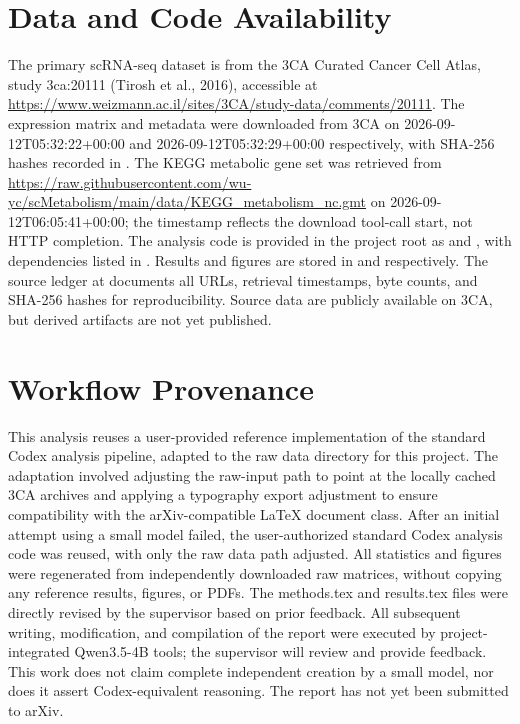 \section{Data and Code Availability}
The primary scRNA-seq dataset is from the 3CA Curated Cancer Cell Atlas, study 3ca:20111 (Tirosh et al., 2016), accessible at \url{https://www.weizmann.ac.il/sites/3CA/study-data/comments/20111}. The expression matrix and metadata were downloaded from 3CA on 2026-09-12T05:32:22+00:00 and 2026-09-12T05:32:29+00:00 respectively, with SHA-256 hashes recorded in . The KEGG metabolic gene set was retrieved from \url{https://raw.githubusercontent.com/wu-yc/scMetabolism/main/data/KEGG_metabolism_nc.gmt} on 2026-09-12T06:05:41+00:00; the timestamp reflects the download tool-call start, not HTTP completion. The analysis code is provided in the project root as  and , with dependencies listed in . Results and figures are stored in  and  respectively. The source ledger at  documents all URLs, retrieval timestamps, byte counts, and SHA-256 hashes for reproducibility. Source data are publicly available on 3CA, but derived artifacts are not yet published.

\section{Workflow Provenance}
This analysis reuses a user-provided reference implementation of the standard Codex analysis pipeline, adapted to the raw data directory for this project. The adaptation involved adjusting the raw-input path to point at the locally cached 3CA archives and applying a typography export adjustment to ensure compatibility with the arXiv-compatible LaTeX document class. After an initial attempt using a small model failed, the user-authorized standard Codex analysis code was reused, with only the raw data path adjusted. All statistics and figures were regenerated from independently downloaded raw matrices, without copying any reference results, figures, or PDFs. The methods.tex and results.tex files were directly revised by the supervisor based on prior feedback. All subsequent writing, modification, and compilation of the report were executed by project-integrated Qwen3.5-4B tools; the supervisor will review and provide feedback. This work does not claim complete independent creation by a small model, nor does it assert Codex-equivalent reasoning. The report has not yet been submitted to arXiv.
